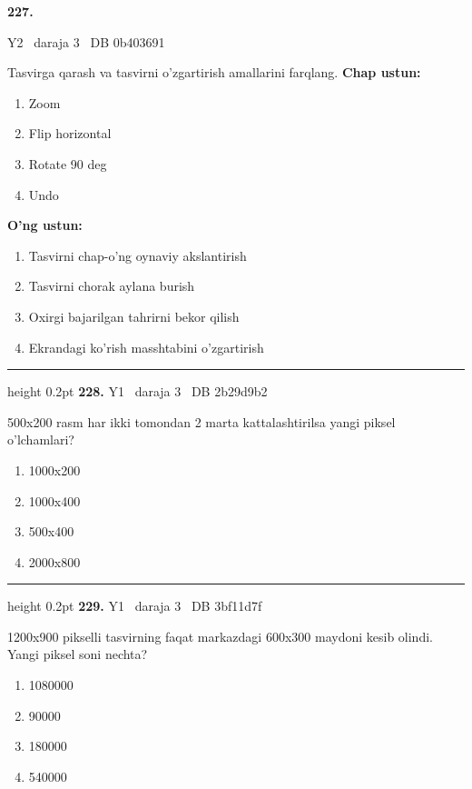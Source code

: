 \documentclass[10pt,a4paper,oneside]{article}
\begin{document}
\hypertarget{q227}{\textbf{\color{ink}227.}}  {\color{muted}\scriptsize Y2 \textbullet\ daraja 3 \textbullet\ DB 0b403691}
\par
Tasvirga qarash va tasvirni o'zgartirish amallarini farqlang.
\textbf{\footnotesize Chap ustun:}
\begin{enumerate}[label=\arabic*),leftmargin=9mm]
\item Zoom
\item Flip horizontal
\item Rotate 90 deg 
\item Undo
\end{enumerate}
\textbf{\footnotesize O'ng ustun:}
\begin{enumerate}[label=\Alph*),leftmargin=9mm]
\item Tasvirni chap-o'ng oynaviy akslantirish
\item Tasvirni chorak aylana burish
\item Oxirgi bajarilgan tahrirni bekor qilish
\item Ekrandagi ko'rish masshtabini o'zgartirish
\end{enumerate}
\vspace{2mm}\hrule height 0.2pt \vspace{4mm}
\hypertarget{q228}{\textbf{\color{ink}228.}}  {\color{muted}\scriptsize Y1 \textbullet\ daraja 3 \textbullet\ DB 2b29d9b2}
\par
500x200 rasm har ikki tomondan 2 marta kattalashtirilsa yangi piksel o'lchamlari?
\begin{enumerate}[label=\Alph*),leftmargin=9mm]
\item 1000x200
\item 1000x400
\item 500x400
\item 2000x800
\end{enumerate}
\vspace{2mm}\hrule height 0.2pt \vspace{4mm}
\hypertarget{q229}{\textbf{\color{ink}229.}}  {\color{muted}\scriptsize Y1 \textbullet\ daraja 3 \textbullet\ DB 3bf11d7f}
\par
1200x900 pikselli tasvirning faqat markazdagi 600x300 maydoni kesib olindi. Yangi piksel soni nechta?
\begin{enumerate}[label=\Alph*),leftmargin=9mm]
\item 1080000
\item 90000
\item 180000
\item 540000
\end{enumerate}
\end{document}

